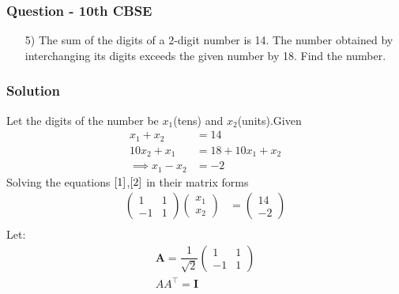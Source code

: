 \documentclass{beamer}
\begin{document}
\begin{frame}
\frametitle{Question - 10th CBSE}
\begin{enumerate}
    \item[5)]
The sum of the digits of a $2$-digit number is 14. The number obtained by interchanging     its digits exceeds the given number by 18. Find the number.
\end{enumerate}
\end{frame}






\begin{frame}
\frametitle{Solution}
Let the digits of the number be $x_1$(tens) and $x_2$(units).Given
\begin{align}
    x_1+x_2 &= 14 \label{1}\\
    10x_2+x_1 &= 18 + 10x_1+x_2\\
    \implies x_1-x_2 &= -2\label{2}
\end{align}
Solving the equations $\eqref{1}$,$\eqref{2}$ in their matrix forms
\begin{align}
    \begin{pmatrix}
        1 & 1\\
        -1 & 1
    \end{pmatrix}
    \begin{pmatrix}
        x_1\\
        x_2
    \end{pmatrix} &= \begin{pmatrix}
        14\\
        -2
    \end{pmatrix}   \\
    \end{align}
    Let:
    \begin{align}
        \textbf{A}=\dfrac{1}{\sqrt{2}}\begin{pmatrix}
        1 & 1\\
        -1 & 1
    \end{pmatrix}\\
    AA^\top = \textbf{I}    
    \end{align}
\end{frame}
\end{document}
